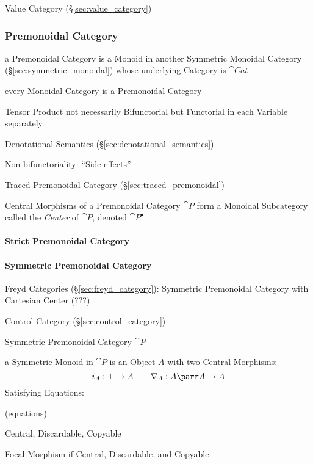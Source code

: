 Value Category (\S\ref{sec:value_category})


\subsubsection{Premonoidal Category}\label{sec:premonoidal_category}

a Premonoidal Category is a Monoid in another Symmetric Monoidal
Category (\S\ref{sec:symmetric_monoidal}) whose underlying Category is
$\cat{Cat}$

every Monoidal Category is a Premonoidal Category

Tensor Product not necessarily Bifunctorial but Functorial in each
Variable separately.

Denotational Semantics (\S\ref{sec:denotational_semantics})

Non-bifunctoriality: ``Side-effects'' \cite{jacobs-heunen-hasuo09}

Traced Premonoidal Category (\S\ref{sec:traced_premonoidal})

Central Morphisms of a Premonoidal Category $\cat{P}$ form a Monoidal
Subcategory called the \emph{Center} of $\cat{P}$, denoted
$\cat{P}^\bullet$



\paragraph{Strict Premonoidal Category}\label{sec:strict_premonoidal}
\hfill

\paragraph{Symmetric Premonoidal Category}
\label{sec:symmetric_premonoidal} \hfill

Freyd Categories (\S\ref{sec:freyd_category}): Symmetric Premonoidal
Category with Cartesian Center (???)

Control Category (\S\ref{sec:control_category})

Symmetric Premonoidal Category $\cat{P}$

a Symmetric Monoid in $\cat{P}$ is an Object $A$ with two Central
Morphisms:
\[
  i_A : \bot \rightarrow A \quad\quad
  \nabla_A : A \parr A \rightarrow A
\]
Satisfying Equations:

(equations) %

Central, Discardable, Copyable

Focal Morphism if Central, Discardable, and Copyable

